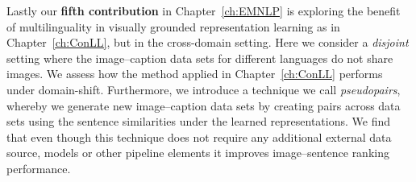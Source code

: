 Lastly our \textbf{fifth contribution} in Chapter~\ref{ch:EMNLP} is exploring the benefit of multilinguality
in visually grounded representation learning as in Chapter~\ref{ch:ConLL}, but in the cross-domain setting.
Here we consider a \emph{disjoint} setting where the image--caption data sets for different languages do
not share images. We assess how the method applied in Chapter~\ref{ch:ConLL} performs under 
domain-shift. Furthermore, we introduce a technique we call \emph{pseudopairs}, whereby we generate
new image--caption data sets by creating pairs across data sets using the sentence similarities under
the learned representations. We find that even though this technique does not require any additional 
external data source, models or other pipeline elements it improves image--sentence ranking performance.




